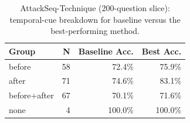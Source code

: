 \begin{table}[h]
\centering
\begin{tabular}{lrrr}
\toprule
Group & N & Baseline Acc. & Best Acc. \\
\midrule
before & 58 & 72.4\% & 75.9\% \\ 
after & 71 & 74.6\% & 83.1\% \\ 
before+after & 67 & 70.1\% & 71.6\% \\ 
none & 4 & 100.0\% & 100.0\% \\ 
\bottomrule
\end{tabular}
\caption{AttackSeq-Technique (200-question slice): temporal-cue breakdown for baseline versus the best-performing method.}
\label{tab:attackseq_technique_temporal_200}
\end{table}
